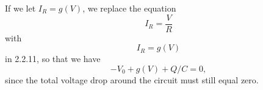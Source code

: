 If we let $I_R = g(V)$, we replace the equation 
\[
    I_R = \frac{V}{R}
\]
with 
\[
    I_R = g(V)
\]
in 2.2.11, so that we have
\[
    -V_0 + g(V) + Q/C = 0,
\]
since the total voltage drop around the circuit must still equal zero.